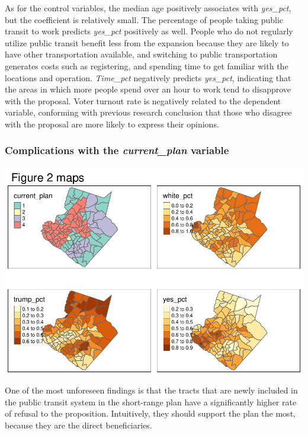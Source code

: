 \documentclass[
]{article}
\begin{document}
As for the control variables, the median age positively associates with
\emph{yes\_pct}, but the coefficient is relatively small. The percentage
of people taking public transit to work predicts \emph{yes\_pct}
positively as well. People who do not regularly utilize public transit
benefit less from the expansion because they are likely to have other
transportation available, and switching to public transportation
generates costs such as registering, and spending time to get familiar
with the locations and operation. \emph{Time\_pct} negatively predicts
\emph{yes\_pct}, indicating that the areas in which more people spend
over an hour to work tend to disapprove with the proposal. Voter turnout
rate is negatively related to the dependent variable, conforming with
previous research conclusion that those who disagree with the proposal
are more likely to express their opinions.

\hypertarget{complications-with-the-current_plan-variable}{%
\subsubsection{\texorpdfstring{Complications with the
\emph{current\_plan}
variable}{Complications with the current\_plan variable}}\label{complications-with-the-current_plan-variable}}

\includegraphics{Zhong_paper_files/figure-latex/create maps-1.pdf}

One of the most unforeseen findings is that the tracts that are newly
included in the public transit system in the short-range plan have a
significantly higher rate of refusal to the proposition. Intuitively,
they should support the plan the most, because they are the direct
beneficiaries.
\end{document}
